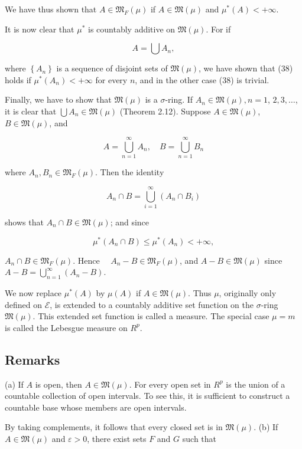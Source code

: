 \documentclass[10pt]{article}
\begin{document}
We have thus shown that $A \in \mathfrak{M}_{F}(\mu)$ if $A \in \mathfrak{M}(\mu)$ and $\mu^{*}(A)<+\infty$.

It is now clear that $\mu^{*}$ is countably additive on $\mathfrak{M}(\mu)$. For if

$$
A=\bigcup A_{n},
$$

where $\left\{A_{n}\right\}$ is a sequence of disjoint sets of $\mathfrak{M}(\mu)$, we have shown that (38) holds if $\mu^{*}\left(A_{n}\right)<+\infty$ for every $n$, and in the other case (38) is trivial.

Finally, we have to show that $\mathfrak{M}(\mu)$ is a $\sigma$-ring. If $A_{n} \in \mathfrak{M}(\mu), n=1$, $2,3, \ldots$, it is clear that $\bigcup A_{n} \in \mathfrak{M}(\mu)$ (Theorem 2.12). Suppose $A \in \mathfrak{M}(\mu)$, $B \in \mathfrak{M}(\mu)$, and

$$
A=\bigcup_{n=1}^{\infty} A_{n}, \quad B=\bigcup_{n=1}^{\infty} B_{n}
$$

where $A_{n}, B_{n} \in \mathfrak{M}_{F}(\mu)$. Then the identity

$$
A_{n} \cap B=\bigcup_{i=1}^{\infty}\left(A_{n} \cap B_{i}\right)
$$

shows that $A_{n} \cap B \in \mathfrak{M}(\mu)$; and since

$$
\mu^{*}\left(A_{n} \cap B\right) \leq \mu^{*}\left(A_{n}\right)<+\infty,
$$

$A_{n} \cap B \in \mathfrak{M}_{F}(\mu)$. Hence $\quad A_{n}-B \in \mathfrak{M}_{F}(\mu)$, and $A-B \in \mathfrak{M}(\mu)$ since $A-B=\bigcup_{n=1}^{\infty}\left(A_{n}-B\right)$.

We now replace $\mu^{*}(A)$ by $\mu(A)$ if $A \in \mathfrak{M}(\mu)$. Thus $\mu$, originally only defined on $\mathscr{E}$, is extended to a countably additive set function on the $\sigma$-ring $\mathfrak{M}(\mu)$. This extended set function is called a measure. The special case $\mu=m$ is called the Lebesgue measure on $R^{p}$.

\subsection{Remarks}
(a) If $A$ is open, then $A \in \mathfrak{M}(\mu)$. For every open set in $R^{p}$ is the union of a countable collection of open intervals. To see this, it is sufficient to construct a countable base whose members are open intervals.

By taking complements, it follows that every closed set is in $\mathfrak{M}(\mu)$. (b) If $A \in \mathfrak{M}(\mu)$ and $\varepsilon>0$, there exist sets $F$ and $G$ such that
\end{document}
